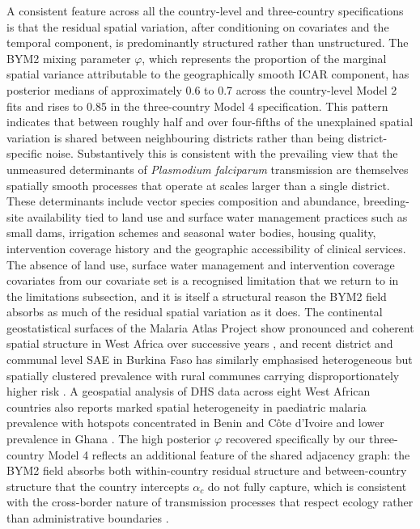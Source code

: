 \documentclass{article}
\begin{document}
A consistent feature across all the country-level and three-country
specifications is that the residual spatial variation, after
conditioning on covariates and the temporal component, is predominantly
structured rather than unstructured. The BYM2 mixing parameter
\(\varphi\), which represents the proportion of the marginal spatial
variance attributable to the geographically smooth ICAR component, has
posterior medians of approximately 0.6 to 0.7 across the country-level
Model 2 fits and rises to 0.85 in the three-country Model 4
specification. This pattern indicates that between roughly half and over
four-fifths of the unexplained spatial variation is shared between
neighbouring districts rather than being district-specific noise.
Substantively this is consistent with the prevailing view that the
unmeasured determinants of \emph{Plasmodium falciparum} transmission are
themselves spatially smooth processes that operate at scales larger than
a single district. These determinants include vector species composition
and abundance, breeding-site availability tied to land use and surface
water management practices such as small dams, irrigation schemes and
seasonal water bodies, housing quality, intervention coverage history
and the geographic accessibility of clinical services. The absence of
land use, surface water management and intervention coverage covariates
from our covariate set is a recognised limitation that we return to in
the limitations subsection, and it is itself a structural reason the
BYM2 field absorbs as much of the residual spatial variation as it does.
The continental geostatistical surfaces of the Malaria Atlas Project
show pronounced and coherent spatial structure in West Africa over
successive years \citep{bhatt2015, weiss2020}, and recent district and
communal level SAE in Burkina Faso has similarly emphasised
heterogeneous but spatially clustered prevalence with rural communes
carrying disproportionately higher risk \citep{bassinga2024}. A
geospatial analysis of DHS data across eight West African countries also
reports marked spatial heterogeneity in paediatric malaria prevalence
with hotspots concentrated in Benin and Côte d'Ivoire and lower
prevalence in Ghana \citep{aide2025}. The high posterior \(\varphi\)
recovered specifically by our three-country Model 4 reflects an
additional feature of the shared adjacency graph: the BYM2 field absorbs
both within-country residual structure and between-country structure
that the country intercepts \(\alpha_c\) do not fully capture, which is
consistent with the cross-border nature of transmission processes that
respect ecology rather than administrative boundaries
\citep{riebler2016}.
\end{document}

